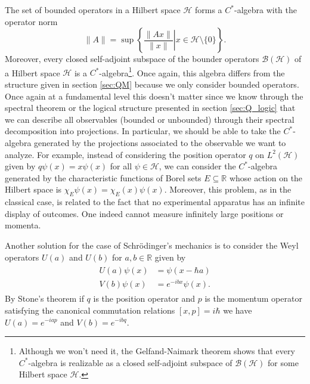 \begin{example}
The set of bounded operators in a Hilbert space $\mathcal{H}$ forms a $C^*$-algebra with the operator norm
\begin{equation}
\|A\|=\sup\left\{\left.\frac{\|Ax\|}{\|x\|}\right|x\in\mathcal{H}\setminus \{0\} \right\}.
\end{equation}
Moreover, every closed self-adjoint subspace of the bounder operators $\mathcal{B}(\mathcal{H})$ of a Hilbert space $\mathcal{H}$ is a $C^*$-algebra\footnote{Although we won't need it, the Gelfand-Naimark theorem shows that every $C^*$-algebra is realizable as a closed self-adjoint subspace of $\mathcal{B}(\mathcal{H})$ for some Hilbert space $\mathcal{H}$\cite{Evans1998}.}. Once again, this algebra differs from the structure given in section \ref{sec:QM} because we only consider bounded operators. Once again at a fundamental level this doesn't matter since we know through the spectral theorem or the logical structure presented in section \ref{sec:Q_logic} that we can describe all observables (bounded or unbounded) through their spectral decomposition into projections. In particular, we should be able to take the $C^*$-algebra generated by the projections associated to the observable we want to analyze. For example, instead of considering the position operator $q$ on $L^2(\mathcal{H})$ given by $q\psi(x)=x\psi(x)$ for all $\psi\in\mathcal{H}$, we can consider the $C^*$-algebra generated by the characteristic functions of Borel sets $E\subseteq\mathbb{R}$ whose action on the Hilbert space is $\chi_E\psi(x) = \chi_E(x)\psi(x)$. Moreover, this problem, as in the classical case, is related to the fact that no experimental apparatus has an infinite display of outcomes. One indeed cannot measure infinitely large positions or momenta.

Another solution for the case of Schrödinger's mechanics is to consider the Weyl operators $U(a)$ and $U(b)$ for $a,b\in\mathbb{R}$ given by
\begin{align}
\begin{split}
U(a)\psi(x) &= \psi(x-\hbar a) \\
V(b)\psi(x) &= e^{-ibx}\psi(x).
\end{split} 
\end{align}
By Stone's theorem if $q$ is the position operator and $p$ is the momentum operator satisfying the canonical commutation relations $[x,p]=i\hbar$ we have $U(a)=e^{-iap}$ and $V(b)=e^{-ibq}$\cite{Strocchi2008a}. 
\end{example}


